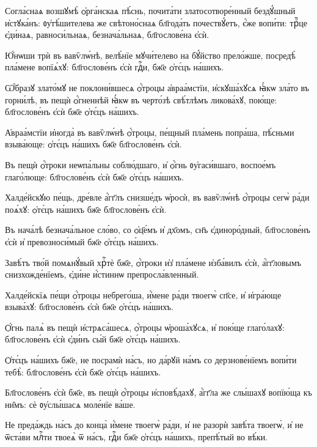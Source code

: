 \hKv Согла́снаѧ возшꙋмѣ̀ ѻ҆рга́нскаѧ  пѣ́снь, почита́ти златосотворе́нный бездꙋ́шный и҆стꙋка́нъ:  ᲂу҆тѣ́шителева же свѣтоно́снаѧ бл҃года́ть почествꙋ́етъ,  є҆́же вопи́ти: трⷪ҇це є҆ди́наѧ, равноси́льнаѧ,  безнача́льнаѧ, бл҃гослове́на є҆сѝ. 
%

\hKv Ю҆́нѡши трѝ въ вавѷлѡ́нѣ, велѣ́нїе мꙋчи́телево на  бꙋ́йство прело́жше, посредѣ̀ пла́мене вопїѧ́хꙋ:  бл҃гослове́нъ є҆сѝ гдⷭ҇и, бж҃е ѻ҆тє́цъ на́шихъ. 

\hKv Ѡ҆́бразꙋ злато́мꙋ не поклони́вшесѧ ѻ҆́троцы а҆враа́мстїи,  и҆скꙋша́хꙋсѧ ꙗ҆́кѡ зла́то въ горни́лѣ, въ пещѝ  ѻ҆́гненнѣй ꙗ҆́кѡ въ черто́зѣ свѣ́тлѣмъ ликова́хꙋ,  пою́ще: бл҃гослове́нъ є҆сѝ бж҃е ѻ҆тє́цъ на́шихъ. 
%

\hKv А҆враа́мстїи и҆ногда̀ въ вавѷлѡ́нѣ  ѻ҆́троцы, пе́щный пла́мень попра́ша, пѣ́сньми взыва́юще:  ѻ҆тє́цъ на́шихъ бж҃е бл҃гослове́нъ є҆сѝ. 

\hKv Въ пещѝ ѻ҆́троки неѡпа́льны соблю́дшаго, и҆ ѻ҆́гнь  ᲂу҆гаси́вшаго, воспое́мъ глаго́люще: бл҃гослове́нъ є҆сѝ  бж҃е ѻ҆тє́цъ на́шихъ. 

\hKv Халде́йскꙋю пе́щь, дре́вле а҆́гг҃лъ снизше́дъ ѡ҆росѝ, въ  вавѷлѡ́нѣ ѻ҆́троцы сегѡ̀ ра́ди поѧ́хꙋ: ѻ҆тє́цъ на́шихъ  бж҃е бл҃гослове́нъ є҆сѝ.  

\hKv Въ нача́лѣ безнача́льное сло́во, со ѻ҆ц҃е́мъ и҆ дх҃омъ,  сн҃ъ є҆диноро́дный, бл҃гослове́нъ є҆сѝ и҆ превозноси́мый  бж҃е ѻ҆тє́цъ на́шихъ. 

\hKv Завѣ́тъ тво́й помѧнꙋ́вый хрⷭ҇тѐ бж҃е, ѻ҆́троки и҆з̾  пла́мене и҆зба́вилъ є҆сѝ, а҆́гг҃ловымъ снизхожде́нїемъ,  є҆ди́не и҆́стиннѡ препросла́вленный. 

\hKv Халде́йскїѧ пе́щи ѻ҆́троцы небрего́ша, и҆́мене ра́ди  твоегѡ̀ сп҃се, и҆ и҆гра́юще взыва́хꙋ: бл҃гослове́нъ є҆сѝ  бж҃е ѻ҆тє́цъ на́шихъ.  

\hKv Ѻ҆́гнь палѧ̀ въ пещѝ и҆стрѧса́шесѧ, ѻ҆́троцы ѡ҆роша́хꙋсѧ,  и҆ пою́ще глаго́лахꙋ: бл҃гослове́нъ є҆сѝ є҆ди́нъ сы́й  бж҃е ѻ҆тє́цъ на́шихъ. 

\hKv Ѻ҆тє́цъ на́шихъ бж҃е, не посрамѝ на́съ, но да́рꙋй на́мъ  со дерзнове́нїемъ вопи́ти тебѣ̀: бл҃гослове́нъ є҆сѝ бж҃е  ѻ҆тє́цъ на́шихъ. 

\hKv Бл҃гослове́нъ є҆сѝ бж҃е, въ пещѝ ѻ҆́троцы и҆сповѣ́дахꙋ,  а҆́гг҃ла же слы́шахꙋ вопїю́ща къ ни̑мъ: сѐ ᲂу҆слы́шасѧ  моле́нїе ва́ше. 

\hKv Не преда́ждь на́съ до конца̀ и҆́мене твоегѡ̀ ра́ди, и҆ не  разорѝ завѣ́та твоегѡ̀, и҆ не  ѿста́ви  млⷭ҇ти твоеѧ̀ ѿ на́съ, гдⷭ҇и бж҃е  ѻ҆тє́цъ на́шихъ, препѣ́тый во вѣ́ки. 

